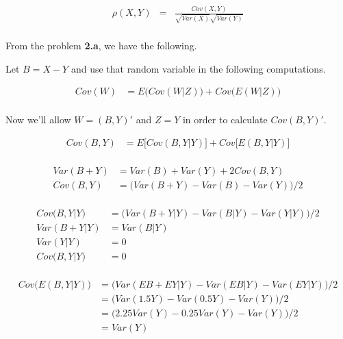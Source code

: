 \documentclass[12pt]{article}
\begin{document}
\begin{equation*}
	\begin{aligned}
	\rho(X,Y) &=& \frac{Cov(X, Y)}{\sqrt{Var(X)}\sqrt{Var(Y)}} \\
	\end{aligned}
\end{equation*}

From the problem \textbf{2.a}, we have the following.

Let $B=X-Y$ and use that random variable in the following computations.

\begin{equation*}
	\begin{aligned}
	Cov(W) &= E\big(Cov(W|Z)\big) + Cov\big(E(W|Z)\big)\\
	\end{aligned}
\end{equation*}

Now we'll allow $W=(B,Y)'$ and $Z=Y$ in order to calculate $Cov(B,Y)'$.

\begin{equation*}
	\begin{aligned}
	Cov(B,Y) &= E\big[Cov(B,Y|Y)\big] + Cov\big[E(B,Y|Y)\big]\\
	\end{aligned}
\end{equation*}

\begin{equation*}
	\begin{aligned}
	Var(B + Y) &= Var(B) + Var(Y) + 2Cov(B,Y) \\
	Cov(B,Y) &= \big(Var(B + Y) - Var(B) - Var(Y)\big)/2 \\
	\end{aligned}
\end{equation*}

\begin{equation*}
	\begin{aligned}
	Cov\big(B,Y|Y\big) &= \big(Var(B + Y|Y) - Var(B|Y) - Var(Y|Y)\big)/2 \\
	Var(B + Y|Y) &= Var(B|Y)\\
	Var(Y|Y)&=0 \\
	Cov\big(B,Y|Y\big) &= 0 \\
	\end{aligned}
\end{equation*}

\begin{equation*}
	\begin{aligned}
	Cov\big(E(B,Y|Y)\big) &= \big(Var(EB + EY|Y) - Var(EB|Y) - Var(EY|Y)\big)/2 \\
	        &= \big(Var(1.5Y) - Var(0.5Y) - Var(Y)\big)/2 \\
	        &= \big(2.25Var(Y) - 0.25Var(Y) - Var(Y)\big)/2 \\
	        &= Var(Y) \\
	\end{aligned}
\end{equation*}
\end{document}
